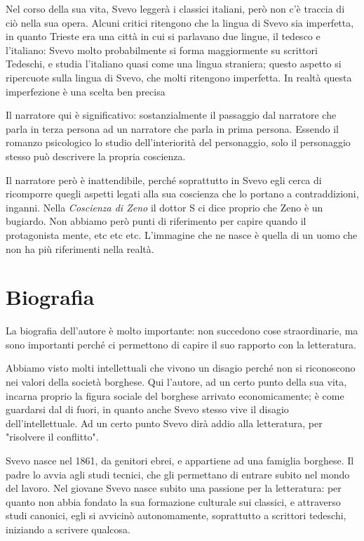\documentclass[a4paper, twoside, titlepage]{book}
\begin{document}
Nel corso della sua vita, Svevo leggerà i classici italiani, però non c'è traccia di ciò nella sua opera. Alcuni critici ritengono che la lingua di Svevo sia imperfetta, in quanto Trieste era una città in cui si parlavano due lingue, il tedesco e l'italiano: Svevo molto probabilmente si forma maggiormente su scrittori Tedeschi, e studia l'italiano quasi come una lingua straniera; questo aspetto si ripercuote sulla lingua di Svevo, che molti ritengono imperfetta.
In realtà questa imperfezione è una scelta ben precisa

Il narratore qui è significativo: sostanzialmente il passaggio dal narratore che parla in terza persona ad un narratore che parla in prima persona. Essendo il romanzo psicologico lo studio dell'interiorità del personaggio, solo il personaggio stesso può descrivere la propria coscienza.

Il narratore però è inattendibile, perché soprattutto in Svevo egli cerca di ricomporre quegli aspetti legati alla sua coscienza che lo portano a contraddizioni, inganni. Nella \textit{Coscienza di Zeno} il dottor S ci dice proprio che Zeno è un bugiardo. Non abbiamo però punti di riferimento per capire quando il protagonista mente, etc etc etc. L'immagine che ne nasce è quella di un uomo che non ha più riferimenti nella realtà.

\section{Biografia}

La biografia dell'autore è molto importante: non succedono cose straordinarie, ma sono importanti perché ci permettono di capire il suo rapporto con la letteratura.

Abbiamo visto molti intellettuali che vivono un disagio perché non si riconoscono nei valori della società borghese. Qui l'autore, ad un certo punto della sua vita, incarna proprio la figura sociale del borghese arrivato economicamente; è come guardarsi dal di fuori, in quanto anche Svevo stesso vive il disagio dell'intellettuale.
Ad un certo punto Svevo dirà addio alla letteratura, per "risolvere il conflitto".

Svevo nasce nel 1861, da genitori ebrei, e appartiene ad una famiglia borghese. Il padre lo avvia agli studi tecnici, che gli permettano di entrare subito nel mondo del lavoro.
Nel giovane Svevo nasce subito una passione per la letteratura: per quanto non abbia fondato la sua formazione culturale sui classici, e attraverso studi canonici, egli si avvicinò autonomamente, soprattutto a scrittori tedeschi, iniziando a scrivere qualcosa.
\end{document}
